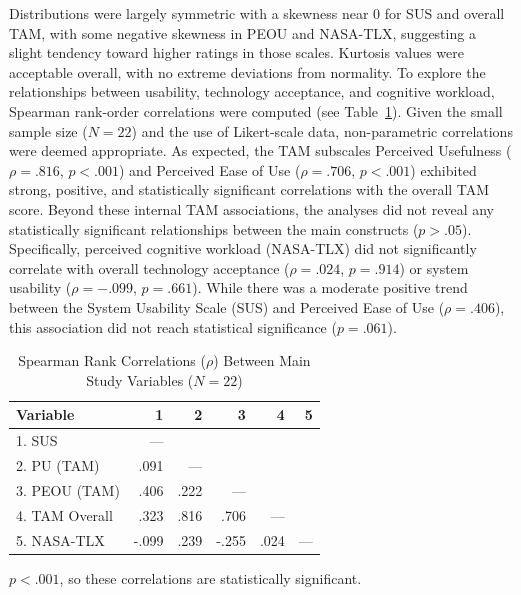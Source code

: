 Distributions were largely symmetric with a skewness near 0 for SUS and overall TAM, with some negative skewness in PEOU and NASA-TLX, suggesting a slight tendency toward higher ratings in those scales. Kurtosis values were acceptable overall, with no extreme deviations from normality.
To explore the relationships between usability, technology acceptance, and cognitive workload, Spearman rank-order correlations were computed (see Table~\ref{tab:correlations}). Given the small sample size ($N = 22$) and the use of Likert-scale data, non-parametric correlations were deemed appropriate. As expected, the TAM subscales Perceived Usefulness ($\rho = .816$, $p < .001$) and Perceived Ease of Use ($\rho = .706$, $p < .001$) exhibited strong, positive, and statistically significant correlations with the overall TAM score. Beyond these internal TAM associations, the analyses did not reveal any statistically significant relationships between the main constructs ($p > .05$). Specifically, perceived cognitive workload (NASA-TLX) did not significantly correlate with overall technology acceptance ($\rho = .024$, $p = .914$) or system usability ($\rho = -.099$, $p = .661$). While there was a moderate positive trend between the System Usability Scale (SUS) and Perceived Ease of Use ($\rho = .406$), this association did not reach statistical significance ($p = .061$).


\begin{table}
  \centering
  \begin{threeparttable}
    \caption{Spearman Rank Correlations ($\rho$) Between Main Study Variables ($N=22$)}
    \label{tab:correlations}
    \small
    \begin{tabular}{l r r r r r}
      \toprule
      \textbf{Variable} & \textbf{1} & \textbf{2} & \textbf{3} & \textbf{4} & \textbf{5} \\
      \midrule
      1. SUS               & ---   &       &       &       &       \\
      2. PU (TAM)          & .091  & ---   &       &       &       \\
      3. PEOU (TAM)        & .406  & .222  & ---   &       &       \\
      4. TAM Overall       & .323  & .816\tnote{*} & .706\tnote{*} & ---   &       \\
      5. NASA-TLX          & -.099 & .239  & -.255 & .024  & ---   \\
      \bottomrule
    \end{tabular}
    \begin{tablenotes}
      \footnotesize
      \item[*] $p < .001$, so these correlations are statistically significant.
    \end{tablenotes}
  \end{threeparttable}
\end{table}